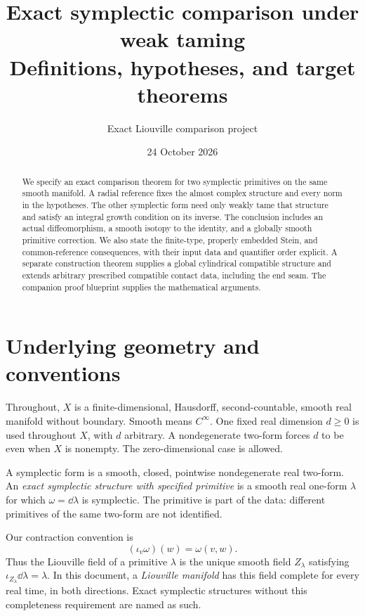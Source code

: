 
\title{Exact symplectic comparison under weak taming\\[5pt]
\large Definitions, hypotheses, and target theorems}
\author{Exact Liouville comparison project}
\date{24 October 2026}

\maketitle
\begin{abstract}
We specify an exact comparison theorem for two symplectic primitives on
the same smooth manifold. A radial reference fixes the almost complex
structure and every norm in the hypotheses. The other symplectic form
need only weakly tame that structure and satisfy an integral growth
condition on its inverse. The conclusion includes an actual
diffeomorphism, a smooth isotopy to the identity, and a globally smooth
primitive correction. We also state the finite-type, properly embedded
Stein, and common-reference consequences, with their input data and
quantifier order explicit. A separate construction theorem supplies a
global cylindrical compatible structure and extends arbitrary prescribed
compatible contact data, including the end seam. The companion proof
blueprint supplies the mathematical arguments.
\end{abstract}

\section{Underlying geometry and conventions}
Throughout, $X$ is a finite-dimensional, Hausdorff, second-countable,
smooth real manifold without boundary. Smooth means $C^\infty$.
One fixed real dimension $d\ge0$ is used throughout $X$, with $d$
arbitrary. A nondegenerate two-form forces $d$ to be even when $X$
is nonempty.
The zero-dimensional case is allowed.

A symplectic form is a smooth, closed, pointwise nondegenerate real
two-form. An \emph{exact symplectic structure with specified primitive}
is a smooth real one-form $\lambda$ for which $\omega=\dd\lambda$
is symplectic. The primitive is part of the data: different primitives
of the same two-form are not identified.

Our contraction convention is
\[
 (\iota_v\omega)(w)=\omega(v,w).
\]
Thus the Liouville field of a primitive $\lambda$ is the unique smooth
field $Z_\lambda$ satisfying $\iota_{Z_\lambda}\dd\lambda=\lambda$.
In this document, a \emph{Liouville manifold} has this field complete
for every real time, in both directions. Exact symplectic structures
without this completeness requirement are named as such.

